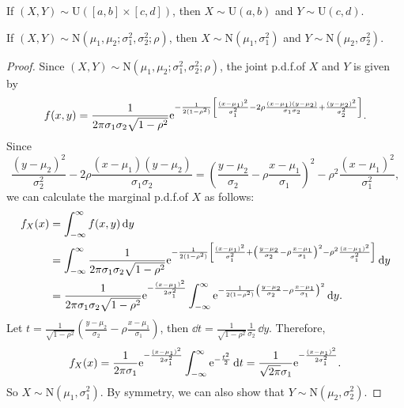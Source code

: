 \begin{proposition}
  If \((X, Y) \sim \mathrm{U}([a, b] \times [c, d])\), then \(X \sim \mathrm{U}(a, b)\) and \(Y \sim \mathrm{U}(c, d)\).
\end{proposition}

\begin{proposition}
  If \((X, Y) \sim \mathrm{N}(\mu_1, \mu_2; \sigma_1^2, \sigma_2^2; \rho)\), then \(X \sim \mathrm{N}(\mu_1, \sigma_1^2)\) and \(Y \sim \mathrm{N}(\mu_2, \sigma_2^2)\).
\end{proposition}
\begin{proof}
  Since \((X, Y) \sim \mathrm{N}(\mu_1, \mu_2; \sigma_1^2, \sigma_2^2; \rho)\), the joint p.d.f.\@ of \(X\) and \(Y\) is given by
  \[
    f(x, y) = \frac{1}{2\mathrm{\pi} \sigma_1 \sigma_2 \sqrt{1 - \rho^2}} \mathrm{e}^{-\frac{1}{2(1 - \rho^2)} \left[\frac{(x - \mu_1)^2}{\sigma_1^2} - 2\rho \frac{(x - \mu_1)(y - \mu_2)}{\sigma_1 \sigma_2} + \frac{(y - \mu_2)^2}{\sigma_2^2}\right]}.
  \]
  Since
  \[
    \frac{(y - \mu_2)^2}{\sigma_2^2} - 2\rho \frac{(x - \mu_1)(y - \mu_2)}{\sigma_1 \sigma_2} = \left(\frac{y - \mu_2}{\sigma_2} - \rho \frac{x - \mu_1}{\sigma_1}\right)^2 - \rho^2 \frac{(x - \mu_1)^2}{\sigma_1^2},
  \]
  we can calculate the marginal p.d.f.\@ of \(X\) as follows:
  \begin{align*}
    f_X(x) &= \int_{-\infty}^\infty f(x, y) \, \mathrm{d} y \\
    &= \int_{-\infty}^\infty \frac{1}{2\mathrm{\pi} \sigma_1 \sigma_2 \sqrt{1 - \rho^2}} \mathrm{e}^{-\frac{1}{2(1 - \rho^2)} \left[\frac{(x - \mu_1)^2}{\sigma_1^2} + \left(\frac{y - \mu_2}{\sigma_2} - \rho \frac{x - \mu_1}{\sigma_1}\right)^2 - \rho^2 \frac{(x - \mu_1)^2}{\sigma_1^2}\right]} \, \mathrm{d} y \\
    &= \frac{1}{2\mathrm{\pi} \sigma_1 \sigma_2 \sqrt{1 - \rho^2}} \mathrm{e}^{-\frac{(x - \mu_1)^2}{2\sigma_1^2}} \int_{-\infty}^\infty \mathrm{e}^{-\frac{1}{2(1 - \rho^2)}\left(\frac{y - \mu_2}{\sigma_2} - \rho \frac{x - \mu_1}{\sigma_1}\right)^2} \, \mathrm{d} y.
  \end{align*}
  Let \(t = \frac{1}{\sqrt{1 - \rho^2}} \left(\frac{y - \mu_2}{\sigma_2} - \rho \frac{x - \mu_1}{\sigma_1}\right)\), then \(\dd t = \frac{1}{\sqrt{1 - \rho^2}} \frac{1}{\sigma_2} \, \dd y\). Therefore,
  \[
    f_X(x) = \frac{1}{2\mathrm{\pi} \sigma_1} \mathrm{e}^{-\frac{(x - \mu_1)^2}{2\sigma_1^2}} \int_{-\infty}^\infty \mathrm{e}^{-\frac{t^2}{2}} \, \mathrm{d} t = \frac{1}{\sqrt{2\mathrm{\pi}} \sigma_1} \mathrm{e}^{-\frac{(x - \mu_1)^2}{2\sigma_1^2}}.
  \]
  So \(X \sim \mathrm{N}(\mu_1, \sigma_1^2)\). By symmetry, we can also show that \(Y \sim \mathrm{N}(\mu_2, \sigma_2^2)\).
\end{proof}

